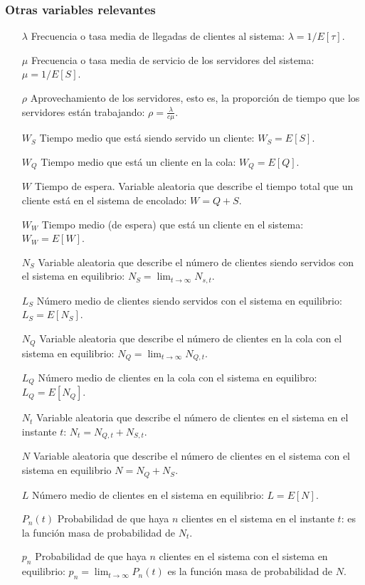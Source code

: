 \documentclass[8pt]{beamer}
\begin{document}
  \begin{frame}\frametitle{Otras variables relevantes}
    \begin{itemize}
    \item [$\lambda$]
      Frecuencia o tasa media de llegadas de clientes al sistema: $\lambda = 1/E[\tau]$.
    \item [$\mu$]
      Frecuencia o tasa media de servicio de los servidores del sistema: $\mu = 1/E[S]$.
    \item [$\rho$]
      Aprovechamiento de los servidores, esto es, la proporción de tiempo que los servidores están trabajando: $\rho = \frac{\lambda}{c\mu}$.
    \item [$W_S$]
      Tiempo medio que está siendo servido un cliente: $W_S  = E[S]$.
    \item [$W_Q$]
      Tiempo medio que está un cliente en la cola: $W_Q = E[Q]$.
    \item [$W$]
      Tiempo de espera. Variable aleatoria que describe el tiempo total que un cliente está en el sistema
      de encolado: $W = Q+S$.
    \item [$W_W$]
      Tiempo medio (de espera) que está un cliente en el sistema: $W_W = E[W]$.
    \item [$N_S$]
      Variable aleatoria que describe el número de clientes siendo servidos con el sistema en equilibrio: $N_S = \lim_{t \rightarrow \infty} N_{s,t}$.
    \item [$L_S$]
      Número medio de clientes siendo servidos con el sistema en equilibrio: \\ $L_S = E[N_S]$.
    \item [$N_Q$]
      Variable aleatoria que describe el número de clientes en la cola con el sistema en equilibrio: $N_Q = \lim_{t \rightarrow \infty} N_{Q,t}$.
    \item [$L_Q$]
      Número medio de clientes en la cola con el sistema en equilibro: $L_Q = E[N_Q]$.
    \item [$N_t$]
      Variable aleatoria que describe el número de clientes en el sistema en el instante $t$: $N_t = N_{Q,t} + N_{S,t}$.
    \item [$N$]
      Variable aleatoria que describe el número de clientes en el sistema con el sistema en equilibrio $N = N_Q + N_S$.
    \item [$L$]
      Número medio de clientes en el sistema en equilibrio: $L = E[N]$.
    \item [$P_n(t)$]
      Probabilidad de que haya $n$ clientes en el sistema en el instante $t$: es la función masa de probabilidad de $N_t$.
    \item [$p_n$]
      Probabilidad de que haya $n$ clientes en el sistema con el sistema en equilibrio: $p_n = \lim_{t \rightarrow \infty} P_n(t)$ es la función masa de probabilidad de $N$.
    \end{itemize}
  \end{frame}
\end{document}
